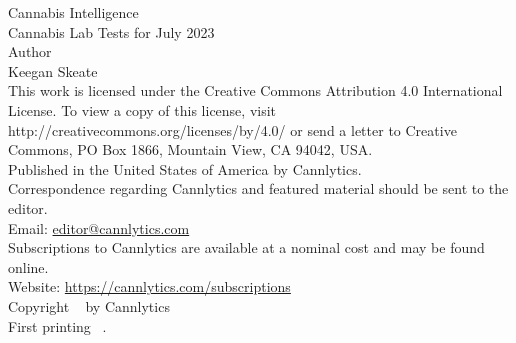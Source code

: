 \documentclass[../article.tex, 11pt]{subfiles}
\begin{document}
{\parindent0pt
{\Large Cannabis Intelligence \\[.25\baselineskip]Cannabis Lab Tests for July 2023}\\[2\baselineskip]
{\Large Author \\[.5\baselineskip]}
\large Keegan Skeate \\[2.\baselineskip]

This work is licensed under the Creative Commons Attribution 4.0 International License. To view a copy of this license, visit http://creativecommons.org/licenses/by/4.0/ or send a letter to Creative Commons, PO Box 1866, Mountain View, CA 94042, USA.\\[.25\baselineskip]

Published in the United States of America by Cannlytics.\\[.25\baselineskip]

Correspondence regarding Cannlytics and featured material should be sent to the editor.\\[.2\baselineskip] Email: \href{mailto:editor@cannlytics.com}{editor@cannlytics.com} \\[.25\baselineskip]

Subscriptions to Cannlytics are available at a nominal cost and may be found online.\\[.2\baselineskip] Website: \href{https://cannlytics.com/subscriptions}{https://cannlytics.com/subscriptions}\\[.25\baselineskip]

\vspace*{2\baselineskip}
\vfill
{\normalsize Copyright \textcopyright ~\the\year{} by Cannlytics\\[\baselineskip]
\normalsize First printing \monthname~\the\year{}.}

}
\end{document}
